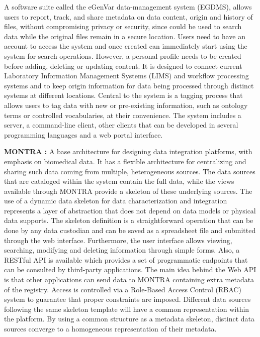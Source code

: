 A software suite called the eGenVar data-management system (EGDMS), allows users to
report, track, and share metadata on data content, origin and history of files, without
compromising privacy or security, since could be used to search data while the original
files remain in a secure location.
Users need to have an account to access the system and once created can immediately
start using the system for search operations.
However, a personal profile needs to be created before adding, deleting or updating
content.
It is designed to connect current Laboratory Information Management Systems (LIMS) and
workflow processing systems and to keep origin information for data being processed
through distinct systems at different locations.
Central to the system is a tagging process that allows users to tag data with new or
pre-existing information, such as ontology terms or controlled vocabularies, at their
convenience.
The system includes a server, a command-line client, other clients that can be
developed in several programming languages and a web portal interface.


\textbf{MONTRA \cite{montra}:}
A base architecture for designing data integration platforms, with emphasis on
biomedical data.
It has a flexible architecture for centralizing and sharing such data coming from
multiple, heterogeneous sources.
The data sources that are cataloged within the system contain the full data, while the
views available through MONTRA provide a skeleton of these underlying sources.
The use of a dynamic data skeleton for data characterization and integration represents
a layer of abstraction that does not depend on data models or physical data supports.
The skeleton definition is a straightforward operation that can be done by any data
custodian and can be saved as a spreadsheet file and submitted through the web
interface.
Furthermore, the user interface allows viewing, searching, modifying and deleting
information through simple forms.
Also, a RESTful API is available which provides a set of programmatic endpoints that
can be consulted by third-party applications.
The main idea behind the Web API is that other applications can send data to MONTRA
containing extra metadata of the registry.
Access is controlled via a Role-Based Access Control (RBAC) system to guarantee that
proper constraints are imposed.
Different data sources following the same skeleton template will have a common
representation within the platform.
By using a common structure as a metadata skeleton, distinct data sources converge to a
homogeneous representation of their metadata.

